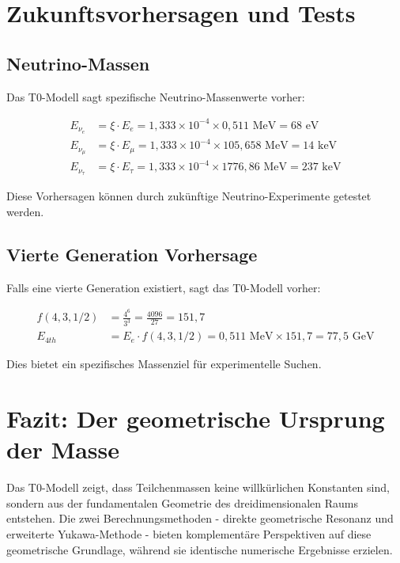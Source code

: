 \documentclass[12pt,a4paper]{report}
\begin{document}
\section{Zukunftsvorhersagen und Tests}
\label{sec:future_predictions}

\subsection{Neutrino-Massen}
\label{subsec:neutrino_masses}

Das T0-Modell sagt spezifische Neutrino-Massenwerte vorher:

\begin{align}
	E_{\nu_e} &= \xi \cdot E_e = 1,333 \times 10^{-4} \times 0,511 \text{ MeV} = 68 \text{ eV} \\
	E_{\nu_\mu} &= \xi \cdot E_\mu = 1,333 \times 10^{-4} \times 105,658 \text{ MeV} = 14 \text{ keV} \\
	E_{\nu_\tau} &= \xi \cdot E_\tau = 1,333 \times 10^{-4} \times 1776,86 \text{ MeV} = 237 \text{ keV}
\end{align}

Diese Vorhersagen können durch zukünftige Neutrino-Experimente getestet werden.

\subsection{Vierte Generation Vorhersage}
\label{subsec:fourth_generation}

Falls eine vierte Generation existiert, sagt das T0-Modell vorher:

\begin{align}
	f(4,3,1/2) &= \frac{4^6}{3^3} = \frac{4096}{27} = 151,7 \\
	E_{4th} &= E_e \cdot f(4,3,1/2) = 0,511 \text{ MeV} \times 151,7 = 77,5 \text{ GeV}
\end{align}

Dies bietet ein spezifisches Massenziel für experimentelle Suchen.

\section{Fazit: Der geometrische Ursprung der Masse}
\label{sec:conclusion_geometric_mass}

Das T0-Modell zeigt, dass Teilchenmassen keine willkürlichen Konstanten sind, sondern aus der fundamentalen Geometrie des dreidimensionalen Raums entstehen. Die zwei Berechnungsmethoden - direkte geometrische Resonanz und erweiterte Yukawa-Methode - bieten komplementäre Perspektiven auf diese geometrische Grundlage, während sie identische numerische Ergebnisse erzielen.
\end{document}
